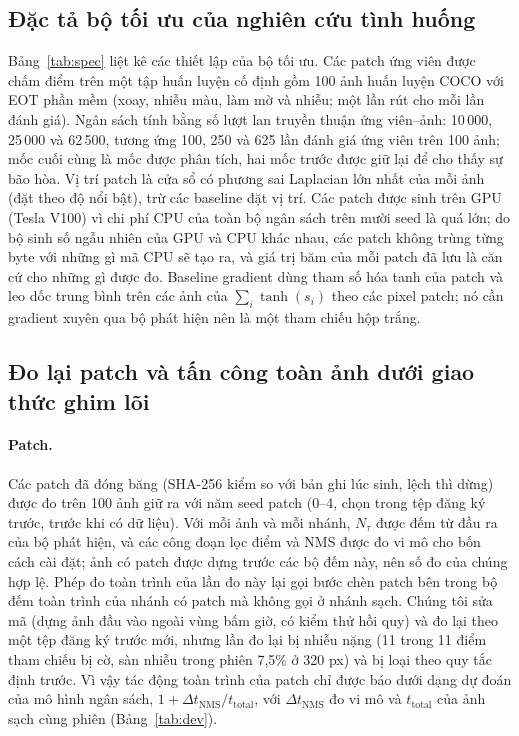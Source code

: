 \documentclass[12pt,a4paper]{article}
\newcommand{\Ntau}{N_{\tau}}
\begin{document}
\subsection{Đặc tả bộ tối ưu của nghiên cứu tình huống}
Bảng~\ref{tab:spec} liệt kê các thiết lập của bộ tối ưu. Các patch ứng viên được chấm điểm trên một tập huấn luyện cố định gồm 100 ảnh huấn luyện COCO \cite{lin2014coco} với EOT phần mềm (xoay, nhiễu màu, làm mờ và nhiễu; một lần rút cho mỗi lần đánh giá). Ngân sách tính bằng số lượt lan truyền thuận ứng viên--ảnh: 10\,000, 25\,000 và 62\,500, tương ứng 100, 250 và 625 lần đánh giá ứng viên trên 100 ảnh; mốc cuối cùng là mốc được phân tích, hai mốc trước được giữ lại để cho thấy sự bão hòa. Vị trí patch là cửa sổ có phương sai Laplacian lớn nhất của mỗi ảnh (đặt theo độ nổi bật), trừ các baseline đặt vị trí. Các patch được sinh trên GPU (Tesla V100) vì chi phí CPU của toàn bộ ngân sách trên mười seed là quá lớn; do bộ sinh số ngẫu nhiên của GPU và CPU khác nhau, các patch không trùng từng byte với những gì mã CPU sẽ tạo ra, và giá trị băm của mỗi patch đã lưu là căn cứ cho những gì được đo. Baseline gradient dùng tham số hóa tanh của patch và leo dốc trung bình trên các ảnh của $\sum_i \tanh(s_i)$ theo các pixel patch; nó cần gradient xuyên qua bộ phát hiện nên là một tham chiếu hộp trắng.



\subsection{Đo lại patch và tấn công toàn ảnh dưới giao thức ghim lõi}
\label{sec:attackdesign}
\paragraph{Patch.} Các patch đã đóng băng (SHA-256 kiểm so với bản ghi lúc sinh, lệch thì dừng) được đo trên 100 ảnh giữ ra với năm seed patch (0--4, chọn trong tệp đăng ký trước, trước khi có dữ liệu). Với mỗi ảnh và mỗi nhánh, $\Ntau$ được đếm từ đầu ra của bộ phát hiện, và các công đoạn lọc điểm và NMS được đo vi mô cho bốn cách cài đặt; ảnh có patch được dựng trước các bộ đếm này, nên số đo của chúng hợp lệ. Phép đo toàn trình của lần đo này lại gọi bước chèn patch bên trong bộ đếm toàn trình của nhánh có patch mà không gọi ở nhánh sạch. Chúng tôi sửa mã (dựng ảnh đầu vào ngoài vùng bấm giờ, có kiểm thử hồi quy) và đo lại theo một tệp đăng ký trước mới, nhưng lần đo lại bị nhiễu nặng (11 trong 11 điểm tham chiếu bị cờ, sàn nhiễu trong phiên 7,5\% ở 320 px) và bị loại theo quy tắc định trước. Vì vậy tác động toàn trình của patch chỉ được báo dưới dạng dự đoán của mô hình ngân sách, $1+\Delta t_{\mathrm{NMS}}/t_{\mathrm{total}}$, với $\Delta t_{\mathrm{NMS}}$ đo vi mô và $t_{\mathrm{total}}$ của ảnh sạch cùng phiên (Bảng~\ref{tab:dev}).
\end{document}
